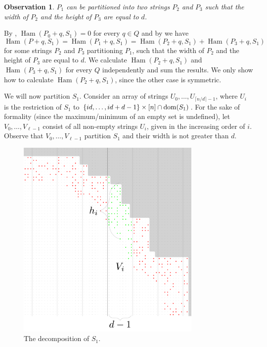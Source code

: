 \documentclass[11pt]{article}
\newcommand{\set}[1]{\left\lbrace #1 \right\rbrace}
\theoremstyle{plain}
\newtheorem{observation}{Observation}
\theoremstyle{definition}
\theoremstyle{remark}
\DeclareMathOperator*{\Ham}{Ham}
\begin{document}
\begin{observation}\label{border_hamming_split}
	$P_1$ can be partitioned into two strings $P_2$ and $P_3$ such that the width of $P_2$ and the height of $P_3$ are equal to $d$.
\end{observation}

By , $\Ham(P_0 + q, S_1) = 0$ for every $q \in Q$
and by  we have 
\[\Ham(P + q, S_1) = \Ham(P_1 + q, S_1) = \Ham(P_2 + q, S_1) + \Ham(P_3 + q, S_1) \]
for some strings $P_2$ and $P_3$ partitioning $P_1$, such that the width of $P_2$ and the height of $P_3$ are equal to $d$.
We calculate $\Ham(P_2 + q, S_1)$ and $\Ham(P_3 + q, S_1)$ for every $Q$ independently and sum the results.
We only show how to calculate $\Ham(P_2 + q, S_1)$, since the other case is symmetric.

We will now partition $S_1$.
Consider an array of strings $U_0, \dots, U_{\lceil n / d \rceil - 1}$, where $U_i$ is the restriction of $S_1$ to $\set{id, \dots, id + d - 1} \times [n] \cap \d{S_1}$.
For the sake of formality (since the maximum/minimum of an empty set is undefined), let $V_0, \dots, V_{\ell - 1}$ consist of all non-empty strings $U_i$, given in the increasing order of $i$.
Observe that $V_0, \dots, V_{\ell - 1}$ partition $S_1$ and their width is not greater than $d$.

\begin{figure}[!t]
	\begin{center}
		\includegraphics[width=0.8\textwidth]{drawings/periphery_decomposition}
	\end{center}
	\caption{The decomposition of $S_1$.}
	\label{figure:periphery_decomposition}
\end{figure}
\end{document}
